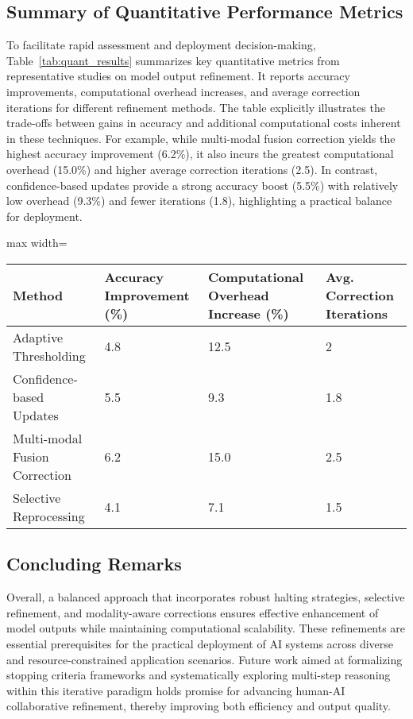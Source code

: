 \documentclass[sigconf]{acmart}
\begin{document}
\subsection{Summary of Quantitative Performance Metrics}
To facilitate rapid assessment and deployment decision-making, Table~\ref{tab:quant_results} summarizes key quantitative metrics from representative studies on model output refinement. It reports accuracy improvements, computational overhead increases, and average correction iterations for different refinement methods. The table explicitly illustrates the trade-offs between gains in accuracy and additional computational costs inherent in these techniques. For example, while multi-modal fusion correction yields the highest accuracy improvement (6.2\%), it also incurs the greatest computational overhead (15.0\%) and higher average correction iterations (2.5). In contrast, confidence-based updates provide a strong accuracy boost (5.5\%) with relatively low overhead (9.3\%) and fewer iterations (1.8), highlighting a practical balance for deployment.

\begin{table*}[htbp]
\centering
\caption{Summary of Key Quantitative Results on Model Output Refinement Efficiency and Performance}
\label{tab:quant_results}
\begin{adjustbox}{max width=\textwidth}
\begin{tabular}{@{}llll@{}}
\toprule
\textbf{Method} & \textbf{Accuracy Improvement (\%)} & \textbf{Computational Overhead Increase (\%)} & \textbf{Avg. Correction Iterations} \\ \midrule
Adaptive Thresholding & 4.8 & 12.5 & 2 \\
Confidence-based Updates & 5.5 & 9.3 & 1.8 \\
Multi-modal Fusion Correction & 6.2 & 15.0 & 2.5 \\
Selective Reprocessing & 4.1 & 7.1 & 1.5 \\ \bottomrule
\end{tabular}
\end{adjustbox}
\end{table*}

\subsection{Concluding Remarks}
Overall, a balanced approach that incorporates robust halting strategies, selective refinement, and modality-aware corrections ensures effective enhancement of model outputs while maintaining computational scalability. These refinements are essential prerequisites for the practical deployment of AI systems across diverse and resource-constrained application scenarios. Future work aimed at formalizing stopping criteria frameworks and systematically exploring multi-step reasoning within this iterative paradigm holds promise for advancing human-AI collaborative refinement, thereby improving both efficiency and output quality.
\end{document}
